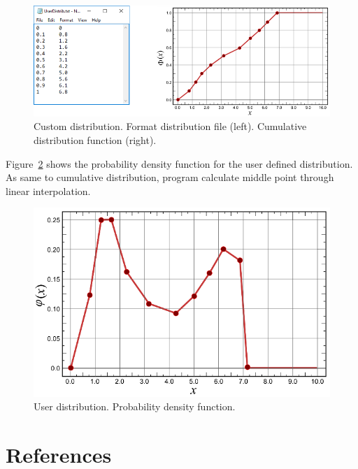 \documentclass[
  letterpaper,
  DIV=11,
  numbers=noendperiod]{scrreprt}
\begin{document}
\begin{figure}

{\centering \includegraphics{./figures/fig-distribution_custom.png}

}

\caption{\label{fig-distribution_custom}Custom distribution. Format
distribution file (left). Cumulative distribution function (right).}

\end{figure}

Figure~\ref{fig-probability_density_custom} shows the probability
density function for the user defined distribution. As same to
cumulative distribution, program calculate middle point through linear
interpolation.

\begin{figure}

{\centering \includegraphics{./figures/fig-probability_density_custom.png}

}

\caption{\label{fig-probability_density_custom}User distribution.
Probability density function.}

\end{figure}

\hypertarget{references-6}{%
\chapter*{References}\label{references-6}}
\end{document}
